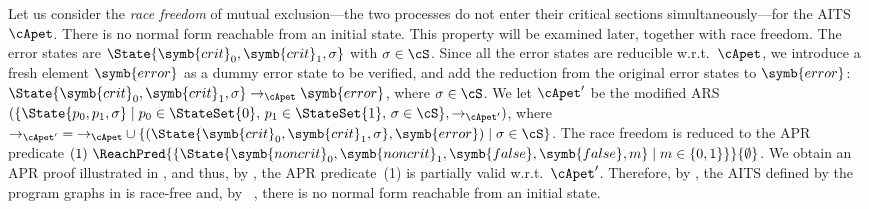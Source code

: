 \begin{example}
	Let us consider the \emph{race freedom} of mutual exclusion---the two processes do not enter their critical sections simultaneously---for the AITS $\cApet$.
	There is no normal form reachable from an initial state.
	This property will be examined later, together with race freedom.
	The error states are $\State{\symb{crit}_0,\symb{crit}_1,\sigma}$ with $\sigma \in \cS$.
	Since all the error states are reducible w.r.t.\ $\cApet$,
	we introduce a fresh element $\symb{error}$ as a dummy error state to be verified, and add
	the reduction from the original error states to $\symb{error}$:
	$\State{\symb{crit}_0,\symb{crit}_1,\sigma} \to_{\cApet} \symb{error}$, where $\sigma \in \cS$.
	We let $\cApet'$ be the modified ARS $(\{ \State{p_0,p_1,\sigma} \mid p_0 \in \StateSet{0}, \, p_1 \in \StateSet{1}, \, \sigma \in \cS \},\to_{\cApet'})$, where
	${\to_{\cApet'}} = {\to_{\cApet}} \cup \{ (\State{\symb{crit}_0,\symb{crit}_1,\sigma}, \symb{error}) \mid \sigma \in \cS \}$.
	The race freedom is reduced to the APR predicate
	$
		(1) ~
		\ReachPred{\{ \State{\symb{noncrit}_0,\symb{noncrit}_1,\symb{false},\symb{false},m} \mid m \in \{0,1\} \}}{\emptyset}
	$.
	We obtain an APR proof illustrated in , and thus, by ,
	the APR predicate~(1) is partially valid w.r.t.\ $\cApet'$.
	Therefore,
	by , the AITS defined by the program graphs in  is race-free and, by ~, there is no normal form reachable from an initial state.
\end{example}

